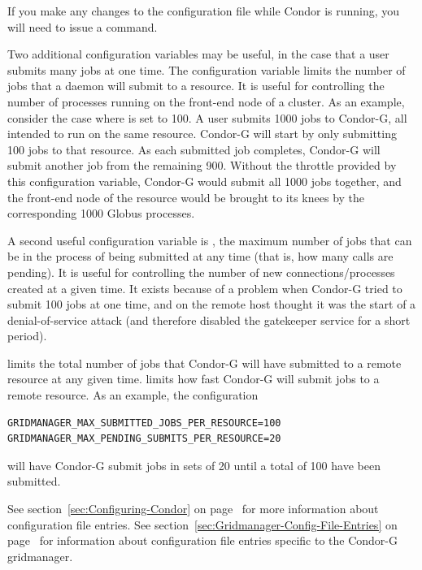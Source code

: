\begin{enumerate}
If you make any changes to the configuration file while
Condor is running, you will need to issue a 
command.

Two additional configuration variables may be useful, 
in the case that a user submits many jobs at one time.
The configuration variable
limits the number of jobs
that a  daemon will submit to a resource.
It is useful for controlling the number of 
processes running on the front-end node of a cluster.
As an example,
consider the case where
is set to 100.
A user submits 1000 jobs to Condor-G, all intended to run
on the same resource.
Condor-G will start by only submitting 100 jobs to that resource.
As each submitted job completes,
Condor-G will submit another job from the remaining 900.
Without the throttle provided by this configuration variable,
Condor-G would submit all 1000 jobs together,
and the front-end node of the resource would be brought to its knees
by the corresponding
1000 Globus  processes.


A second useful configuration variable is
,
the maximum number of jobs
that can be in the process of being submitted at any time (that is,
how many  calls are pending).
It is useful for controlling the number of new
connections/processes created at a given time.
It exists because of a problem
when Condor-G tried to submit 100 jobs at one time,
and  on the remote host thought it was the
start of a denial-of-service attack (and therefore
disabled the gatekeeper service for a short period).

limits the total number of jobs that Condor-G will have submitted
to a remote resource at any given time.
 limits
how fast Condor-G will submit jobs to a remote resource.
As an example, the configuration
\begin{verbatim}
GRIDMANAGER_MAX_SUBMITTED_JOBS_PER_RESOURCE=100
GRIDMANAGER_MAX_PENDING_SUBMITS_PER_RESOURCE=20
\end{verbatim}
will have Condor-G submit jobs in sets of 20 until a total of 100 have
been submitted.

See section~\ref{sec:Configuring-Condor} on
page~\pageref{sec:Configuring-Condor} for
more information about configuration file entries.
See section~\ref{sec:Gridmanager-Config-File-Entries} on
page~\pageref{sec:Gridmanager-Config-File-Entries} for information
about  configuration file entries specific to the Condor-G
gridmanager.

\end{enumerate}

